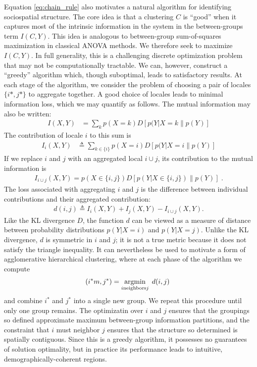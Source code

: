 \documentclass[english]{scrartcl}
\begin{document}
	Equation \eqref{eq:chain_rule} also motivates a natural algorithm for identifying sociospatial structure. The core idea is that a clustering $C$ is ``good'' when it captures most of the intrinsic information in the system in the between-groups term $I(C,Y)$. This idea is analogous to between-group sum-of-squares maximization in classical ANOVA methods. We therefore seek to maximize $I(C,Y)$. In full generality, this is a challenging discrete optimization problem that may not be computationally tractable. We can, however, construct a ``greedy'' algorithm which, though suboptimal, leads to satisfactory results. At each stage of the algorithm, we consider the problem of choosing a pair of locales $\{i*, j*\}$ to aggregate together. A good choice of locales leads to minimal information loss, which we may quantify as follows. The mutual information may also be written: 
	\begin{align}
	 	I(X,Y) &= \sum_k p(X = k) D[p(Y|X = k\|p(Y)] 
	\end{align} 
	The contribution of locale $i$ to this sum is 
	\begin{align}
		I_{i}(X,Y) &\triangleq \sum_{k \in \{i\}} p(X = i)D[p(Y|X = i\|p(Y)] 
	\end{align}
	If we replace $i$ and $j$ with an aggregated local $i\cup j$, its contribution to the mutual information is 
	\begin{align}
		I_{i\cup j}(X,Y) = p(X \in \{i,j\}) D[p(Y|X \in \{i,j\}) \| p(Y)]\;.
	\end{align}
	The  loss associated with aggregating $i$ and $j$ is the difference between individual contributions and their aggregated contribution:
	\begin{align}
		d(i,j) \triangleq I_{i}(X,Y) + I_{j}(X,Y) - I_{i \cup j}(X,Y).  
	\end{align}
	Like the KL divergence $D$, the function $d$ can be viewed as a measure of distance between probability distributions $p(Y|X = i)$ and $p(Y|X = j)$. Unlike the KL divergence, $d$ is symmetric in $i$ and $j$; it is not a true metric because it does not satisfy the triangle inequality. It can nevertheless be used to motivate a form of agglomerative hierarchical clustering, where at each phase of the algorithm we compute 
	\begin{equation}
		(i^*m, j^*) = \argmin_{i \text{neighbors} j} \; d(i,j)\;
	\end{equation}
	and combine $i^*$ and $j^*$ into a single new group. We repeat this procedure until only one group remains. The optimizatin over $i$ and $j$ ensures that the groupings so defined approximate maximum between-group information partitions, and the constraint that $i$ must neighbor $j$ ensures that the structure so determined is spatially contiguous. Since this is a greedy algorithm, it possesses no guarantees of solution optimality, but in practice its performance leads to intuitive, demographically-coherent regions. 
\end{document}
